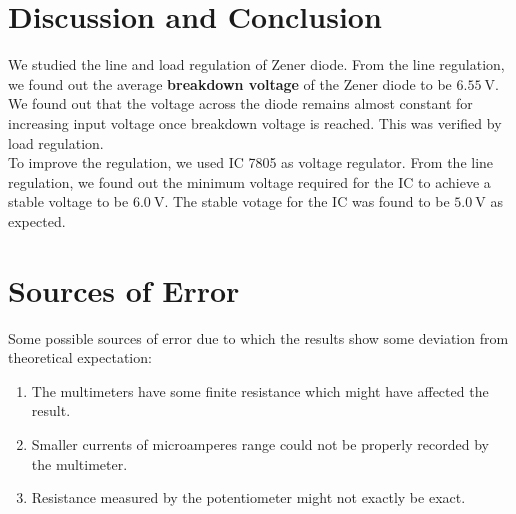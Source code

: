 \documentclass{scrartcl}
\begin{document}
\section{Discussion and Conclusion}
We studied the line and load regulation of Zener diode. From the line regulation, we found out the average \textbf{breakdown voltage} of the Zener diode to be \textbf{$\SI{6.55}{\volt}$}. We found out that the voltage across the diode remains almost constant for increasing input voltage once breakdown voltage is reached. This was verified by load regulation.\\[0.3cm]
To improve the regulation, we used IC 7805 as voltage regulator. From the line regulation, we found out the minimum voltage required for the IC to achieve a stable voltage to be \textbf{$\SI{6.0}{\volt}$}. The stable votage for the IC was found to be \textbf{$\SI{5.0}{\volt}$} as expected.  
\section{Sources of Error}
Some possible sources of error due to which the results show some deviation from theoretical expectation:
\begin{enumerate}
        \item The multimeters have some finite resistance which might have affected the result. 
        \item Smaller currents of microamperes range could not be properly recorded by the multimeter. 
        \item Resistance measured by the potentiometer might not exactly be exact.  
\end{enumerate} 
\end{document}

